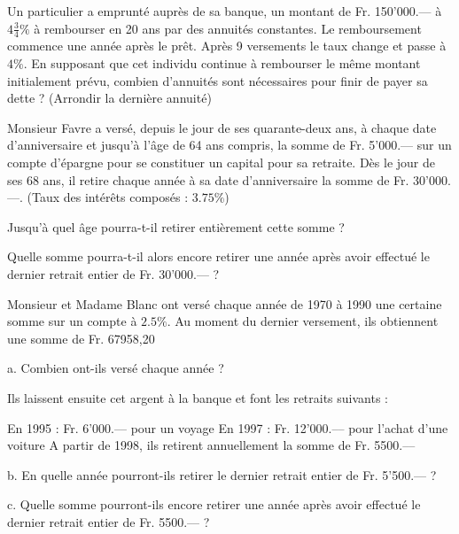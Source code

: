 \begin{exercice}
Un particulier a emprunté auprès de sa banque, un montant de Fr. 150'000.— à $4\frac{3}{4} \%$ à rembourser en 20 ans par des annuités constantes. Le remboursement commence une année après le prêt. Après 9 versements le taux change et passe à $4 \%$. En supposant que cet individu continue à rembourser le même montant initialement prévu, combien d’annuités sont nécessaires pour finir de payer sa dette ? (Arrondir la dernière annuité)
\end{exercice}

\begin{exercice}
Monsieur Favre a versé, depuis le jour de ses quarante-deux ans, à chaque date d’anniversaire et jusqu’à l’âge de 64 ans compris, la somme de Fr. 5’000.— sur un compte d’épargne pour se constituer un capital pour sa retraite. 
Dès le jour de ses 68 ans, il retire chaque année à sa date d’anniversaire la somme de Fr. 30’000.—. (Taux des intérêts composés : $3.75 \%$)

Jusqu’à quel âge pourra-t-il retirer entièrement cette somme ?

Quelle somme pourra-t-il alors encore retirer une année après avoir effectué le dernier retrait entier de Fr. 30’000.— ?
\end{exercice}

\begin{exercice}
Monsieur et Madame Blanc ont versé chaque année de 1970 à 1990 une certaine somme sur un compte à $2.5 \%$. Au moment du dernier versement, ils obtiennent une somme de Fr. 67958,20

a.	Combien ont-ils versé chaque année ?

Ils laissent ensuite cet argent à la banque et font les retraits suivants :

En 1995 : Fr. 6'000.–– pour un voyage
En 1997 : Fr. 12'000.–– pour l'achat d'une voiture
A partir de 1998, ils retirent annuellement la somme de Fr. 5500.––

b.	En quelle année pourront-ils retirer le dernier retrait entier de Fr. 5'500.–– ?

c.	Quelle somme pourront-ils encore retirer une année après avoir effectué le dernier retrait entier de Fr. 5500.–– ?
\end{exercice}

